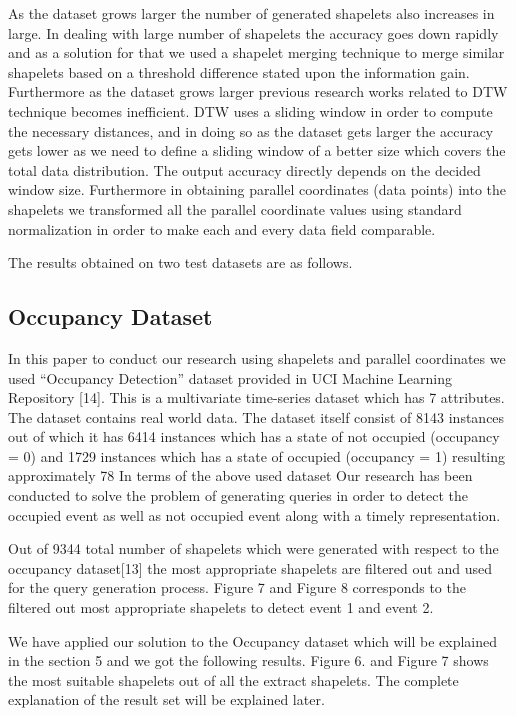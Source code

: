 \documentclass[letterpaper, 10 pt, conference]{IEEEtran}  %
\begin{document}
As the dataset grows larger the number of generated shapelets also increases in large. In dealing with large number of shapelets the accuracy goes down rapidly and as a solution for that we used a shapelet merging technique to merge similar shapelets based on a threshold difference stated upon the information gain. Furthermore as the dataset grows larger previous research works related to DTW technique becomes inefficient. DTW uses a sliding window in order to compute the necessary distances, and in doing so as the dataset gets larger the accuracy gets lower as we need to define a sliding window of a better size which covers the total data distribution. The output accuracy directly depends on the decided window size. Furthermore in obtaining parallel coordinates (data points) into the shapelets we transformed all the parallel coordinate values using standard normalization in order to make each and every data field comparable. 

The results obtained on two test datasets are as follows. 

\subsection{Occupancy Dataset} 
In this paper to conduct our research using shapelets and parallel coordinates we used “Occupancy Detection” dataset provided in UCI Machine Learning Repository [14]. This is a multivariate time-series dataset which has 7 attributes. The dataset contains real world data. The dataset itself consist of 8143 instances out of which it has 6414 instances which has a state of not occupied (occupancy = 0) and 1729 instances which has a state of occupied (occupancy = 1) resulting approximately 78%
In terms of the above used dataset Our research has been conducted to solve the problem of generating queries in order to detect the occupied event as well as not occupied event along with a timely representation. 

Out of 9344 total number of shapelets which were generated with respect to the occupancy dataset[13] the most appropriate shapelets are filtered out and used for the query generation process. Figure 7 and Figure 8 corresponds to the filtered out most appropriate shapelets to detect event 1 and event 2.

We have applied our solution to the Occupancy dataset which will be explained in the section 5 and we got the following results. Figure 6. and Figure 7 shows the most suitable shapelets out of all the extract shapelets. The complete explanation of the result set will be explained later.
\end{document}
